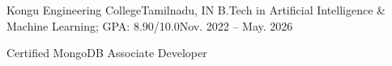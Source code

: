 \documentclass[11pt,a4paper]{article}
\begin{document}
\listStart
\begin{body}
\itemWithTitleAndSubHeading
{Kongu Engineering College}{Tamilnadu, IN}
{B.Tech in Artificial Intelligence \& Machine Learning; GPA: 8.90/10.0}{Nov.
2022 -- May. 2026}
\end{body}
\listEnd


\listStart
\begin{body}
\item Certified MongoDB Associate Developer{}
\end{body}
\listEnd
\end{document}
